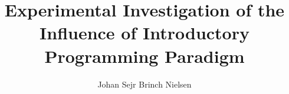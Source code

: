 \documentclass[12pt,oneside,a4paper]{article}
\begin{document}
  \fontsize{12}{15}
  \selectfont




\makeatletter %
\def\maketitle{%
 \null
 \thispagestyle{empty}%
 \vfill
 \begin{center}\leavevmode
   \normalfont
   \LARGE{\raggedleft \@title\par}%
   \hrulefill\par
   \large{\raggedright \subtitle\par}%
   \vskip 2cm
   {\@date\par}%
 \end{center}%
 \vfill
 \begin{flushleft}
   {\large \@author } \\
   {\footnotesize \suplementInfo }
 \end{flushleft}
 \clearpage %
}
\makeatother %
\title{Experimental Investigation of the Influence of Introductory
  Programming Paradigm}
\def\subtitle{HCC $\cdot$ Human-Centered Computing}
\author{Johan Sejr Brinch Nielsen}
\def\suplementInfo{

\kern 5pt \hrule width 11pc \kern 5pt

\begin{tabular}{ll}
Email: & zerrez@diku.dk  \\
Cpr.:  & 260886-2547 \\
Supervisor: & Jakob G. Simonsen
\end{tabular}

\kern 5pt \hrule width 11pc \kern 5pt

Dept. of Computer Science,  \\
University of Copenhagen

}

\end{document}
